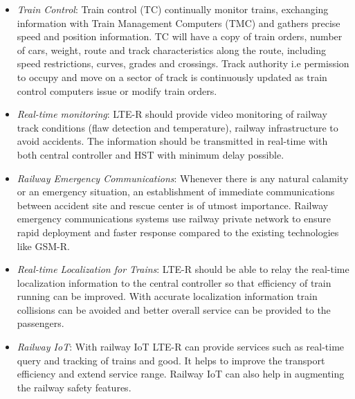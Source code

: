 \begin{itemize}
\item \textit{Train Control}: Train control (TC) continually monitor trains, exchanging information with Train Management Computers (TMC) and gathers precise speed and position information. TC will have a copy of train orders, number of cars, weight, route and track characteristics along the route, including speed restrictions, curves, grades and crossings. Track authority i.e permission to occupy and move on a sector of track is continuously updated as train control computers issue or modify train orders.

\item \textit{Real-time monitoring}: LTE-R should provide video monitoring of railway track conditions (flaw detection and temperature), railway infrastructure to avoid accidents. The information should be transmitted in real-time with both central controller and HST with minimum delay possible. 

\item \textit{Railway Emergency Communications}: Whenever there is any natural calamity or an emergency situation, an establishment of immediate communications between accident site and rescue center is of utmost importance. Railway emergency communications systems use railway private network to ensure rapid deployment and faster response compared to the existing technologies like GSM-R. 

\item \textit{Real-time Localization for Trains}: LTE-R should be able to relay the real-time localization information to the central controller so that efficiency of train running can be improved. With accurate localization information train collisions can be avoided and better overall service can be provided to the passengers.

\item \textit{Railway IoT}: With railway IoT LTE-R can provide services such as real-time query and tracking of trains and good. It helps to improve the transport efficiency and extend service range. Railway IoT can also help in augmenting the railway safety features.
\end{itemize}

